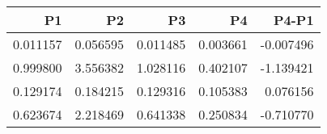 \begin{tabular}{rrrrr}
\toprule
P1 & P2 & P3 & P4 & P4-P1 \\
\midrule
0.011157 & 0.056595 & 0.011485 & 0.003661 & -0.007496 \\
0.999800 & 3.556382 & 1.028116 & 0.402107 & -1.139421 \\
0.129174 & 0.184215 & 0.129316 & 0.105383 & 0.076156 \\
0.623674 & 2.218469 & 0.641338 & 0.250834 & -0.710770 \\
\bottomrule
\end{tabular}
